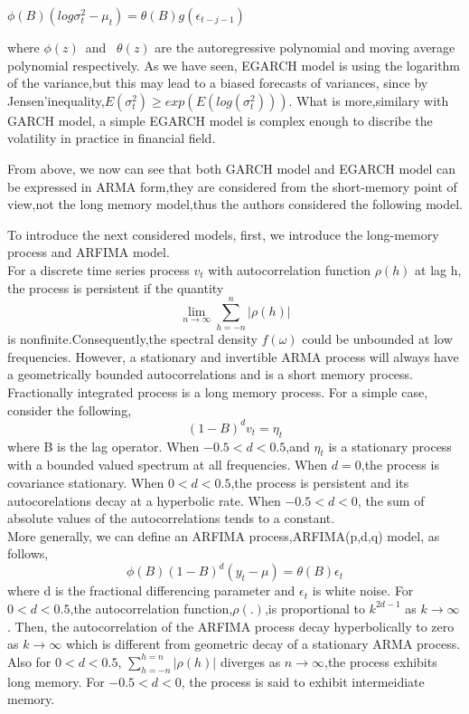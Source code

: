 \documentclass[10pt,a4paper]{article}
\begin{document}
\begin{center}$\displaystyle \phi(B)(log\sigma^2_t-\mu_t)=\theta(B)g(\epsilon_{t-j-1})$\end{center}

where $\phi(z)$\ and \ $\theta(z)$ are the autoregressive polynomial  and moving average polynomial respectively. As we have seen, EGARCH model is using the logarithm of the variance,but this may lead to a biased forecasts of variances, since by Jensen'inequality,$E(\sigma^2_t)\geq exp(E(log(\sigma^2_t)))$. What is more,similary with GARCH model, a simple EGARCH model is complex enough to discribe the volatility in practice in financial field.





From above, we now can see that both GARCH model and EGARCH model can be expressed in ARMA form,they are considered from the short-memory point of view,not the long memory model,thus the authors considered the following model.


  
  To introduce the next considered models, first, we introduce the long-memory process and ARFIMA model.\\
  
  For a discrete time series process $v_t$ with autocorrelation function $\rho (h)$ at lag h, the process is persistent if the quantity
$$\lim\limits_{n\rightarrow\infty} \sum_{h=-n}^{n}|\rho(h)|$$
is nonfinite.Consequently,the spectral density $f(\omega)$ could be unbounded at low frequencies. However, a stationary and invertible ARMA process will always have a geometrically bounded autocorrelations and is a short memory process. Fractionally integrated process is a long memory process. For a simple case, consider the following,
$$(1-B)^dv_t=\eta_t$$
where B is the lag operator. When $-0.5<d<0.5$,and $\eta_t$ is a stationary process with a bounded valued spectrum at all frequencies. When $d=0$,the process is covariance stationary. When $0<d<0.5$,the process is persistent and its autocorelations decay at a hyperbolic rate. When $-0.5<d<0$, the sum of absolute values of the autocorrelations tends to a constant.\\

 More generally, we can define an ARFIMA process,ARFIMA(p,d,q) model, as follows,
$$\phi(B)(1-B)^d(y_t-\mu)=\theta(B)\epsilon_t$$
where d is the fractional differencing parameter and $\epsilon_t$ is white noise. For $0<d<0.5$,the autocorrelation function,$\rho(.)$,is proportional to $k^{2d-1}$ as $k\rightarrow\infty$. Then, the autocorrelation of the ARFIMA process decay hyperbolically to zero as $k\rightarrow\infty$ which is different from geometric decay of a stationary ARMA process. Also for $0<d<0.5$, $\sum_{h=-n}^{h=n} |\rho(h)|$ diverges as $n\rightarrow \infty$,the process exhibits long memory. For $-0.5<d<0$, the process is said to exhibit intermeidiate memory. \cite{shumway2000time} \\
\end{document}
